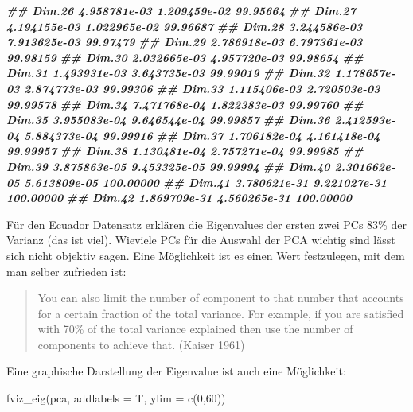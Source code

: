 \documentclass[
]{article}
\newenvironment{Shaded}{\begin{snugshade}}{\end{snugshade}}
\newcommand{\AttributeTok}[1]{\textcolor[rgb]{0.77,0.63,0.00}{#1}}
\newcommand{\DecValTok}[1]{\textcolor[rgb]{0.00,0.00,0.81}{#1}}
\newcommand{\DocumentationTok}[1]{\textcolor[rgb]{0.56,0.35,0.01}{\textbf{\textit{#1}}}}
\newcommand{\FunctionTok}[1]{\textcolor[rgb]{0.00,0.00,0.00}{#1}}
\newcommand{\NormalTok}[1]{#1}
\begin{document}
\begin{Shaded}
\begin{Highlighting}[]
\DocumentationTok{\#\# Dim.26 4.958781e{-}03     1.209459e{-}02                    99.95664}
\DocumentationTok{\#\# Dim.27 4.194155e{-}03     1.022965e{-}02                    99.96687}
\DocumentationTok{\#\# Dim.28 3.244586e{-}03     7.913625e{-}03                    99.97479}
\DocumentationTok{\#\# Dim.29 2.786918e{-}03     6.797361e{-}03                    99.98159}
\DocumentationTok{\#\# Dim.30 2.032665e{-}03     4.957720e{-}03                    99.98654}
\DocumentationTok{\#\# Dim.31 1.493931e{-}03     3.643735e{-}03                    99.99019}
\DocumentationTok{\#\# Dim.32 1.178657e{-}03     2.874773e{-}03                    99.99306}
\DocumentationTok{\#\# Dim.33 1.115406e{-}03     2.720503e{-}03                    99.99578}
\DocumentationTok{\#\# Dim.34 7.471768e{-}04     1.822383e{-}03                    99.99760}
\DocumentationTok{\#\# Dim.35 3.955083e{-}04     9.646544e{-}04                    99.99857}
\DocumentationTok{\#\# Dim.36 2.412593e{-}04     5.884373e{-}04                    99.99916}
\DocumentationTok{\#\# Dim.37 1.706182e{-}04     4.161418e{-}04                    99.99957}
\DocumentationTok{\#\# Dim.38 1.130481e{-}04     2.757271e{-}04                    99.99985}
\DocumentationTok{\#\# Dim.39 3.875863e{-}05     9.453325e{-}05                    99.99994}
\DocumentationTok{\#\# Dim.40 2.301662e{-}05     5.613809e{-}05                   100.00000}
\DocumentationTok{\#\# Dim.41 3.780621e{-}31     9.221027e{-}31                   100.00000}
\DocumentationTok{\#\# Dim.42 1.869709e{-}31     4.560265e{-}31                   100.00000}
\end{Highlighting}
\end{Shaded}

Für den Ecuador Datensatz erklären die Eigenvalues der ersten zwei PCs 83\% der Varianz (das ist viel). Wieviele PCs für die Auswahl der PCA wichtig sind lässt sich nicht objektiv sagen. Eine Möglichkeit ist es einen Wert festzulegen, mit dem man selber zufrieden ist:

\begin{quote}
You can also limit the number of component to that number that accounts for a certain fraction of the total variance. For example, if you are satisfied with 70\% of the total variance explained then use the number of components to achieve that. (Kaiser 1961)
\end{quote}

Eine graphische Darstellung der Eigenvalue ist auch eine Möglichkeit:

\begin{Shaded}
\begin{Highlighting}[]

\FunctionTok{fviz\_eig}\NormalTok{(pca, }\AttributeTok{addlabels =}\NormalTok{ T, }\AttributeTok{ylim =} \FunctionTok{c}\NormalTok{(}\DecValTok{0}\NormalTok{,}\DecValTok{60}\NormalTok{))}
\end{Highlighting}
\end{Shaded}
\end{document}
